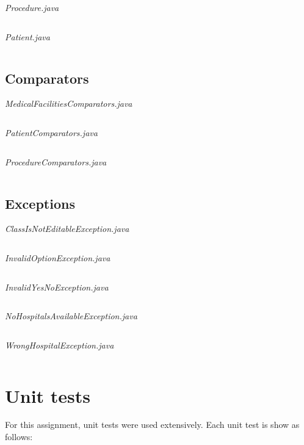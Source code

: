 \documentclass{article}
\begin{document}
	\textit{Procedure.java}
	\inputminted{java}{src/main/java/com/yvesstraten/medicalconsole/facilities/Procedure.java}

	\textit{Patient.java}
	\inputminted{java}{src/main/java/com/yvesstraten/medicalconsole/Patient.java}

	\pagebreak
	
	\subsection{Comparators}\label{sub:comparators} %
	\textit{MedicalFacilitiesComparators.java}
	\inputminted{java}{src/main/java/com/yvesstraten/medicalconsole/comparators/MedicalFacilitiesComparators.java}

	\textit{PatientComparators.java}
	\inputminted{java}{src/main/java/com/yvesstraten/medicalconsole/comparators/PatientComparators.java}

	\textit{ProcedureComparators.java}
	\inputminted{java}{src/main/java/com/yvesstraten/medicalconsole/comparators/ProcedureComparators.java}

  \newpage

	\subsection{Exceptions}\label{sub:exceptions} %
	\textit{ClassIsNotEditableException.java}
	\inputminted{java}{src/main/java/com/yvesstraten/medicalconsole/exceptions/ClassIsNotEditableException.java}

	\textit{InvalidOptionException.java}
	\inputminted{java}{src/main/java/com/yvesstraten/medicalconsole/exceptions/InvalidOptionException.java}

	\textit{InvalidYesNoException.java}
	\inputminted{java}{src/main/java/com/yvesstraten/medicalconsole/exceptions/InvalidYesNoException.java}

	\textit{NoHospitalsAvailableException.java}
	\inputminted{java}{src/main/java/com/yvesstraten/medicalconsole/exceptions/NoHospitalsAvailableException.java}

	\textit{WrongHospitalException.java}
	\inputminted{java}{src/main/java/com/yvesstraten/medicalconsole/exceptions/WrongHospitalException.java}

	\section{Unit tests}\label{sec:unit_tests} %
	For this assignment, unit tests were used extensively. Each unit test is show as follows:
	
\end{document}

